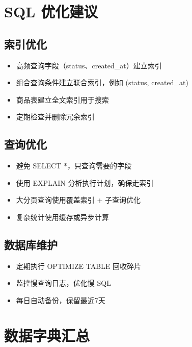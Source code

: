 \documentclass[12pt,a4paper,UTF8]{ctexart}
\begin{document}
\section{SQL 优化建议}

\subsection{索引优化}

\begin{itemize}[itemsep=3pt]
    \item 高频查询字段（status、created\_at）建立索引
    \item 组合查询条件建立联合索引，例如 (status, created\_at)
    \item 商品表建立全文索引用于搜索
    \item 定期检查并删除冗余索引
\end{itemize}

\subsection{查询优化}

\begin{itemize}[itemsep=3pt]
    \item 避免 SELECT *，只查询需要的字段
    \item 使用 EXPLAIN 分析执行计划，确保走索引
    \item 大分页查询使用覆盖索引 + 子查询优化
    \item 复杂统计使用缓存或异步计算
\end{itemize}

\subsection{数据库维护}

\begin{itemize}[itemsep=3pt]
    \item 定期执行 OPTIMIZE TABLE 回收碎片
    \item 监控慢查询日志，优化慢 SQL
    \item 每日自动备份，保留最近7天
\end{itemize}

\newpage
\appendix
\section{数据字典汇总}
\end{document}
